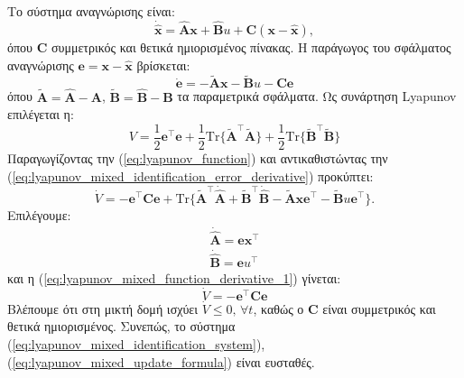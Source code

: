 \documentclass[a4paper,12pt]{article}
\begin{document}
Το σύστημα αναγνώρισης είναι:
\begin{equation}
    \dot{\hat{\mathbf{x}}} = \hat{\mathbf{A}}\mathbf{x} + \hat{\mathbf{B}} u + 
    \mathbf{C}(\mathbf{x} - \hat{\mathbf{x}}),
    \label{eq:lyapunov_mixed_identification_system}
\end{equation}
όπου $\mathbf{C}$ συμμετρικός και θετικά ημιορισμένος πίνακας. Η παράγωγος του σφάλματος αναγνώρισης 
$\mathbf{e} = \mathbf{x} - \hat{\mathbf{x}}$ 
βρίσκεται:
\begin{equation}
    \dot{\mathbf{e}} = -\tilde{\mathbf{A}}\mathbf{x} - \tilde{\mathbf{B}}u - \mathbf{C}\mathbf{e}
    \label{eq:lyapunov_mixed_identification_error_derivative}
\end{equation}
όπου $\tilde{\mathbf{A}} = \hat{\mathbf{A}} - \mathbf{A}$,
$\tilde{\mathbf{B}} = \hat{\mathbf{B}} - \mathbf{B}$ τα παραμετρικά σφάλματα.
Ως συνάρτηση Lyapunov επιλέγεται η:
\begin{equation}
    V = \frac{1}{2}\mathbf{e}^{\top}\mathbf{e} + 
    \frac{1}{2}\mathrm{Tr}\{\tilde{\mathbf{A}}^{\top}\tilde{\mathbf{A}}\}
    + \frac{1}{2}\mathrm{Tr}\{\tilde{\mathbf{B}}^{\top}\tilde{\mathbf{B}}\}
    \label{eq:lyapunov_function}
\end{equation}
Παραγωγίζοντας την (\ref{eq:lyapunov_function}) και αντικαθιστώντας
την (\ref{eq:lyapunov_mixed_identification_error_derivative}) προκύπτει:
\begin{equation}
    \dot{V} = -\mathbf{e}^{\top}\mathbf{C}\mathbf{e} + 
    \mathrm{Tr}\{\tilde{\mathbf{A}}^{\top}\dot{\hat{\mathbf{A}}} + 
    \tilde{\mathbf{B}}^{\top}\dot{\hat{\mathbf{B}}} - 
    \tilde{\mathbf{A}}\mathbf{x}\mathbf{e}^{\top} - 
    \tilde{\mathbf{B}}u\mathbf{e}^{\top}\}.
    \label{eq:lyapunov_mixed_function_derivative_1}  
\end{equation}
Επιλέγουμε:
\begin{equation}
    \begin{aligned}
        \dot{\hat{\mathbf{A}}} = \mathbf{e}\mathbf{x}^{\top} \\ 
        \dot{\hat{\mathbf{B}}} = \mathbf{e}u^{\top}
    \end{aligned}
    \label{eq:lyapunov_mixed_update_formula}
\end{equation}
και η (\ref{eq:lyapunov_mixed_function_derivative_1}) γίνεται:
\begin{equation}
    \dot{V} = -\mathbf{e}^{\top}\mathbf{C}\mathbf{e}
    \label{eq:lyapunov_mixed_function_derivative_2}
\end{equation}
Βλέπουμε ότι στη μικτή δομή ισχύει $\dot{V} \leq 0, \, \forall t$, καθώς ο $\mathbf{C}$ είναι 
συμμετρικός και θετικά ημιορισμένος. Συνεπώς, το σύστημα (\ref{eq:lyapunov_mixed_identification_system}), 
(\ref{eq:lyapunov_mixed_update_formula}) είναι ευσταθές.
\end{document}
